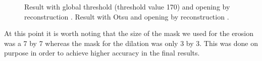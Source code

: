 \begin{figure}
	\centering
	\hfil
	\caption{Result with global threshold (threshold value 170) and opening by reconstruction \protect{}. Result with Otsu and opening by reconstruction \protect{}.}
	\label{fig:methods:preprocessing}
\end{figure}

At this point it is worth noting that the size of the mask we used for the erosion was a 7 by 7 whereas the mask for the dilation was only 3 by 3. This was done on purpose in order to achieve higher accuracy in the final results.
